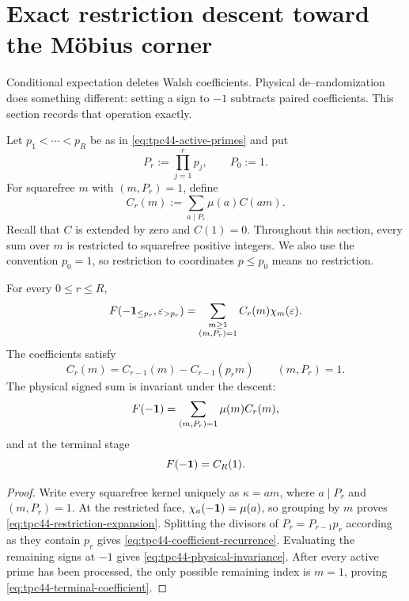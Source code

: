 \section{Exact restriction descent toward the M\"obius corner}
\label{sec:tpc44-coefficient-descent}

Conditional expectation deletes Walsh coefficients.  Physical
de--randomization does something different: setting a sign to \(-1\)
subtracts paired coefficients.  This section records that operation
exactly.

Let \(p_1<\cdots<p_R\) be as in \eqref{eq:tpc44-active-primes} and put
\begin{equation}
 P_r:=\prod_{j=1}^{r}p_j,
 \qquad P_0:=1.
 \label{eq:tpc44-Pr}
\end{equation}
For squarefree \(m\) with \((m,P_r)=1\), define
\begin{equation}
 C_r(m):=\sum_{a\mid P_r}\mu(a)C(am).
 \label{eq:tpc44-Cr-definition}
\end{equation}
Recall that \(C\) is extended by zero and \(C(1)=0\).
Throughout this section, every sum over \(m\) is restricted to squarefree
positive integers.  We also use the convention \(p_0=1\), so restriction
to coordinates \(p\le p_0\) means no restriction.

\begin{proposition}
\label{prop:tpc44-physical-restriction}
For every \(0\le r\le R\),
\begin{equation}
 F(-\mathbf 1_{\le p_r},\varepsilon_{>p_r})
 =\sum_{\substack{m\ge1\\(m,P_r)=1}}C_r(m)\chi_m(\varepsilon).
 \label{eq:tpc44-restriction-expansion}
\end{equation}
The coefficients satisfy
\begin{equation}
 C_r(m)=C_{r-1}(m)-C_{r-1}(p_rm)
 \qquad (m,P_r)=1.
 \label{eq:tpc44-coefficient-recurrence}
\end{equation}
The physical signed sum is invariant under the descent:
\begin{equation}
 F(-\mathbf 1)
 =\sum_{(m,P_r)=1}\mu(m)C_r(m),
 \label{eq:tpc44-physical-invariance}
\end{equation}
and at the terminal stage
\begin{equation}
 F(-\mathbf 1)=C_R(1).
 \label{eq:tpc44-terminal-coefficient}
\end{equation}
\end{proposition}

\begin{proof}
Write every squarefree kernel uniquely as \(\kappa=am\), where
\(a\mid P_r\) and \((m,P_r)=1\).  At the restricted face,
\(
 \chi_a(-\mathbf 1)=\mu(a)
\), so grouping by \(m\) proves \eqref{eq:tpc44-restriction-expansion}.
Splitting the divisors of \(P_r=P_{r-1}p_r\) according as they contain
\(p_r\) gives \eqref{eq:tpc44-coefficient-recurrence}.  Evaluating the
remaining signs at \(-1\) gives \eqref{eq:tpc44-physical-invariance}.
After every active prime has been processed, the only possible remaining
index is \(m=1\), proving \eqref{eq:tpc44-terminal-coefficient}.
\end{proof}

